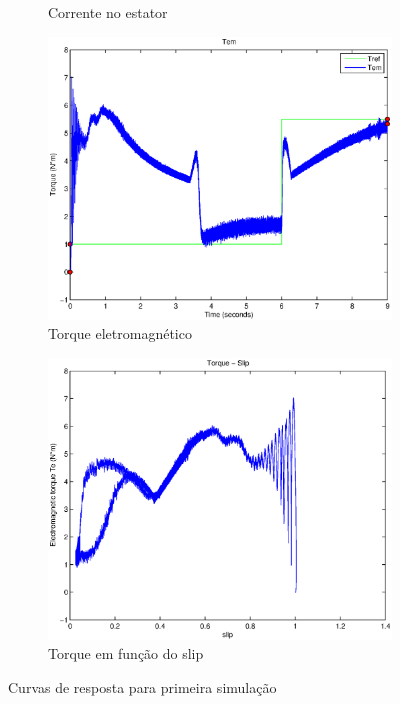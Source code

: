 \documentclass{article}
\begin{document}
\begin{figure}[H]
\begin{subfigure}[b]{0.49\linewidth}
		\caption{Corrente no estator}
	\end{subfigure}
	\begin{subfigure}[b]{0.49\linewidth}
		\centering
		\includegraphics[width=\linewidth]{matlab/tem}
		\caption{Torque eletromagnético}
	\end{subfigure}
		\begin{subfigure}[b]{0.49\linewidth}
			\centering
			\includegraphics[width=\linewidth]{matlab/ts}
			\caption{Torque em função do slip}
		\end{subfigure}
	\caption{Curvas de resposta para primeira simulação}
	\label{fig:s1}
\end{figure}
\end{document}
